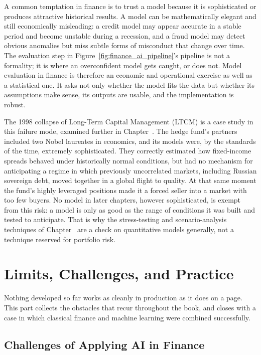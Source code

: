 \documentclass[../ai_in_finance]{subfiles}
\begin{document}
A common temptation in finance is to trust a model because it is sophisticated or produces attractive historical results. A model can be mathematically elegant and still economically misleading: a credit model may appear accurate in a stable period and become unstable during a recession, and a fraud model may detect obvious anomalies but miss subtle forms of misconduct that change over time. The evaluation step in Figure~\ref{fig:finance_ai_pipeline}'s pipeline is not a formality; it is where an overconfident model gets caught, or does not. Model evaluation in finance is therefore an economic and operational exercise as well as a statistical one. It asks not only whether the model fits the data but whether its assumptions make sense, its outputs are usable, and the implementation is robust.

The 1998 collapse of Long-Term Capital Management (LTCM) is a case study in this failure mode, examined further in Chapter~. The hedge fund's partners included two Nobel laureates in economics, and its models were, by the standards of the time, extremely sophisticated.
They correctly estimated how fixed-income spreads behaved under historically normal conditions, but had no mechanism for anticipating a regime in which previously uncorrelated markets, including Russian sovereign debt, moved together in a global flight to quality. At that same moment the fund's highly leveraged positions made it a forced seller into a market with too few buyers. No model in later chapters, however sophisticated, is exempt from this risk: a model is only as good as the range of conditions it was built and tested to anticipate. That is why the stress-testing and scenario-analysis techniques of Chapter~ are a check on quantitative models generally, not a technique reserved for portfolio risk.

\section{Limits, Challenges, and Practice}

Nothing developed so far works as cleanly in production as it does on a page. This part collects the obstacles that recur throughout the book, and closes with a case in which classical finance and machine learning were combined successfully.

\subsection{Challenges of Applying AI in Finance}
\label{sec:intro-challenges}
\end{document}
